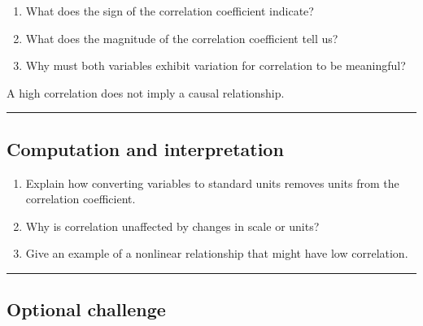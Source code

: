 \documentclass[
  letterpaper,
  DIV=11,
  numbers=noendperiod]{scrreprt}
\begin{document}
\begin{enumerate}
\def\labelenumi{\arabic{enumi}.}
\setcounter{enumi}{3}
\item
  What does the sign of the correlation coefficient indicate?
\item
  What does the magnitude of the correlation coefficient tell us?
\item
  Why must both variables exhibit variation for correlation to be
  meaningful?
\end{enumerate}

\begin{tcolorbox}[enhanced jigsaw, coltitle=black, colbacktitle=quarto-callout-warning-color!10!white, left=2mm, bottomrule=.15mm, bottomtitle=1mm, colback=white, titlerule=0mm, colframe=quarto-callout-warning-color-frame, breakable, leftrule=.75mm, toptitle=1mm, opacitybacktitle=0.6, rightrule=.15mm, title=\textcolor{quarto-callout-warning-color}{\faExclamationTriangle}\hspace{0.5em}{Common pitfall}, arc=.35mm, opacityback=0, toprule=.15mm]

A high correlation does not imply a causal relationship.

\end{tcolorbox}

\begin{center}\rule{0.5\linewidth}{0.5pt}\end{center}

\subsection{Computation and
interpretation}\label{computation-and-interpretation}

\begin{enumerate}
\def\labelenumi{\arabic{enumi}.}
\setcounter{enumi}{6}
\item
  Explain how converting variables to standard units removes units from
  the correlation coefficient.
\item
  Why is correlation unaffected by changes in scale or units?
\item
  Give an example of a nonlinear relationship that might have low
  correlation.
\end{enumerate}

\begin{center}\rule{0.5\linewidth}{0.5pt}\end{center}

\subsection{Optional challenge}\label{optional-challenge-2}
\end{document}
